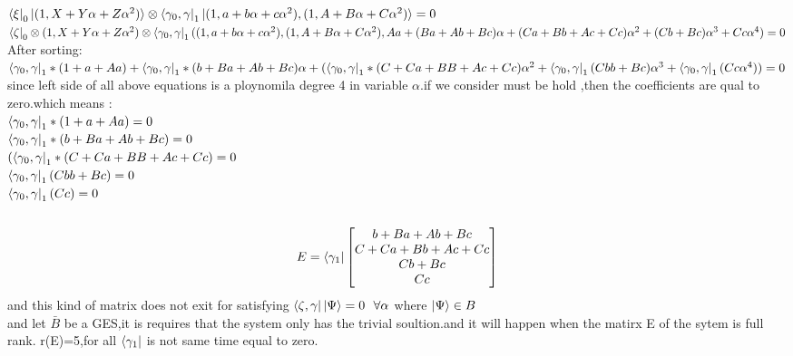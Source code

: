 \documentclass[12pt,twoside]{report}
\begin{document}
 \\
 $ \bra{\xi}_{0}\ket{(1,X+Y\alpha+Z\alpha^{2})}\otimes\bra{\gamma_{0},\gamma}_{1}\ket{(1,a+b\alpha+c\alpha^{2}),(1,A+B\alpha+C\alpha^{2})}=0 $\\
 $ \bra{\zeta}_{0}\otimes(1,X+Y\alpha+Z\alpha^{2})\otimes\bra{\gamma_{0},\gamma}_{1}((1,a+b\alpha+c\alpha^{2}),(1,A+B\alpha+C\alpha^{2}),Aa+(Ba+Ab+Bc)\alpha+(Ca+Bb+Ac+Cc)\alpha^{2}+(Cb+Bc)\alpha^{3}+Cc\alpha^{4})=0 $\\
 After sorting:\\
 $ \bra{\gamma_{0},\gamma}_{1}*(1+a+Aa)+\bra{\gamma_{0},\gamma}_{1}*(b+Ba+Ab+Bc)\alpha+(\bra{\gamma_{0},\gamma}_{1}*(C+Ca+BB+Ac+Cc)\alpha^{2}+\bra{\gamma_{0},\gamma}_{1}(Cbb+Bc)\alpha^{3}+\bra{\gamma_{0},\gamma}_{1}(Cc\alpha^{4}))=0$
 \\
 since left side of all above equations is a ploynomila degree 4 in variable $\alpha$.if we consider must be hold ,then the coefficients are qual to zero.which means :
 \\
 $ \bra{\gamma_{0},\gamma}_{1}*(1+a+Aa) =0$\\
 $\bra{\gamma_{0},\gamma}_{1}*(b+Ba+Ab+Bc)=0  $\\
 $ (\bra{\gamma_{0},\gamma}_{1}*(C+Ca+BB+Ac+Cc)=0 $\\
 $ \bra{\gamma_{0},\gamma}_{1}(Cbb+Bc)=0 $\\
 $ \bra{\gamma_{0},\gamma}_{1}(Cc)=0 $
 \\
 $  $
 \\
\begin{equation}
E=\bra{\gamma_{1}}
\begin{bmatrix}
b+Ba+Ab+Bc\\
C+Ca+Bb+Ac+Cc\\
Cb+Bc\\
Cc
\end{bmatrix}
\end{equation}
and this kind of matrix does not exit for satisfying $ \bra{\zeta,\gamma}\ket{\Psi}=0 \ \  \forall \alpha $ where $ \ket{\Psi}\in B $\\
 and let $ \bar{B} $ be a GES,it is requires that the system only has the trivial soultion.and it will happen when the matirx E of the sytem is full rank.
 r(E)=5,for all $ \bra{\gamma_{1}} $ is not same time equal to zero.
\end{document}
